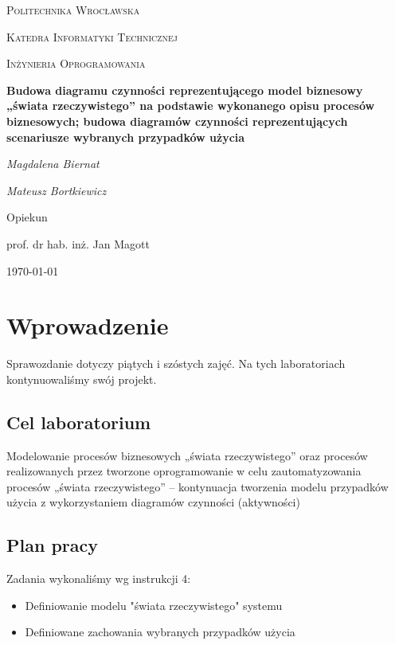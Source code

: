 \documentclass{article}
\begin{document}
	
	\begin{titlepage}
		\centering
		{\scshape\LARGE Politechnika Wrocławska \par}
		{\scshape\Large Katedra Informatyki Technicznej\par}
		
		\vspace{1cm}
		{\scshape\Large Inżynieria Oprogramowania\par}
		\vspace{1.5cm}
		{\huge\bfseries Budowa diagramu czynności reprezentującego model
			biznesowy „świata rzeczywistego” na podstawie
			wykonanego opisu procesów biznesowych; budowa
			diagramów czynności reprezentujących scenariusze
			wybranych przypadków użycia\par}
		\vspace{2cm}
		{\Large\itshape Magdalena Biernat\par}
		{\Large\itshape Mateusz Bortkiewicz\par}
		\vfill
		Opiekun\par
		prof. dr hab. inż. Jan Magott 
		
		\vfill
		{\large \today\par}
	\end{titlepage}
	\newpage
	
	\section{Wprowadzenie}
	Sprawozdanie dotyczy piątych i szóstych zajęć. Na tych laboratoriach kontynuowaliśmy swój projekt. 
	
	\subsection{Cel laboratorium}
Modelowanie procesów biznesowych „świata rzeczywistego” oraz
procesów realizowanych przez tworzone oprogramowanie w celu
zautomatyzowania procesów „świata rzeczywistego” – kontynuacja
tworzenia modelu przypadków użycia z wykorzystaniem diagramów
czynności (aktywności)
	
	\subsection{Plan pracy}
	Zadania wykonaliśmy wg instrukcji 4:

	\begin{itemize}
		\item Definiowanie modelu "świata rzeczywistego" systemu
		\item Definiowane zachowania wybranych przypadków użycia
	\end{itemize}
\newpage
\end{document}
